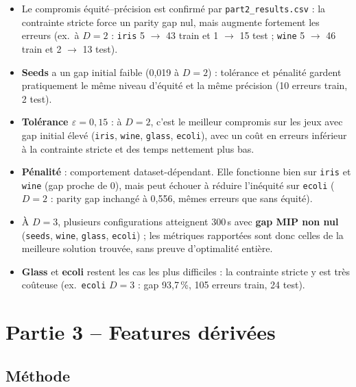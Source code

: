\documentclass[a4paper,10pt,titlepage,leqno]{article}
\begin{document}
\begin{resultbox}
\begin{itemize}
  \item Le compromis équité--précision est confirmé par \texttt{part2\_results.csv} : la contrainte stricte force un parity gap nul, mais augmente fortement les erreurs (ex.\ à $D{=}2$ : \texttt{iris} 5 $\to$ 43 train et 1 $\to$ 15 test ; \texttt{wine} 5 $\to$ 46 train et 2 $\to$ 13 test).
  \item \textbf{Seeds} a un gap initial faible (0{,}019 à $D{=}2$) : tolérance et pénalité gardent pratiquement le même niveau d'équité et la même précision (10 erreurs train, 2 test).
  \item \textbf{Tolérance $\varepsilon=0{,}15$} : à $D{=}2$, c'est le meilleur compromis sur les jeux avec gap initial élevé (\texttt{iris}, \texttt{wine}, \texttt{glass}, \texttt{ecoli}), avec un coût en erreurs inférieur à la contrainte stricte et des temps nettement plus bas.
  \item \textbf{Pénalité} : comportement dataset-dépendant. Elle fonctionne bien sur \texttt{iris} et \texttt{wine} (gap proche de 0), mais peut échouer à réduire l'inéquité sur \texttt{ecoli} ($D{=}2$ : parity gap inchangé à 0{,}556, mêmes erreurs que sans équité).
  \item À $D{=}3$, plusieurs configurations atteignent 300\,s avec \textbf{gap MIP non nul} (\texttt{seeds}, \texttt{wine}, \texttt{glass}, \texttt{ecoli}) ; les métriques rapportées sont donc celles de la meilleure solution trouvée, sans preuve d'optimalité entière.
  \item \textbf{Glass} et \textbf{ecoli} restent les cas les plus difficiles : la contrainte stricte y est très coûteuse (ex.\ \texttt{ecoli} $D{=}3$ : gap 93{,}7\,\%, 105 erreurs train, 24 test).
\end{itemize}
\end{resultbox}


\section{Partie 3 -- Features dérivées}
\label{sec:part3}

\subsection{Méthode}
\end{document}
